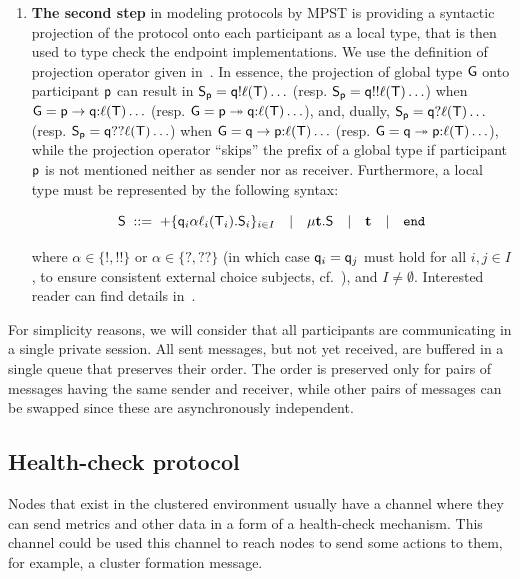 \begin{enumerate}[start=1,label={(\bfseries \arabic*)}]
	\item \textbf{The second step} in modeling protocols by MPST is providing a syntactic projection of the protocol onto each participant as a local type, that is then used to
	type check the endpoint implementations.  
	We use the definition of projection operator given in~\cite[Figure \ref{fig:fig2}]{HuY17}. 
	In essence, the projection of global type ${\sf G}$ onto participant ${\sf p}$ can result in 
	${\mathsf S}_{\sf p}={\sf q}{!}\ell({\mathsf T})\ldots$ (resp. ${\mathsf S}_{\sf p}={\sf q}{!!}\ell({\mathsf T})\ldots$) 
	when ${\sf G}={\sf p}\to{\sf q}{:}\ell({\mathsf T})\ldots$ (resp. ${\sf G}={\sf p}\twoheadrightarrow{\sf q}{:}\ell({\mathsf T})\ldots$), 
	and, dually, ${\mathsf S}_{\sf p}={\sf q}{?}\ell({\mathsf T})\ldots$ (resp. ${\mathsf S}_{\sf p}={\sf q}{??}\ell({\mathsf T})\ldots$) when ${\sf G}={\sf q}\to{\sf p}{:}\ell({\mathsf T})\ldots$ 
	(resp. ${\sf G}={\sf q}\twoheadrightarrow{\sf p}{:}\ell({\mathsf T})\ldots$), 
	while the projection operator ``skips'' the prefix of a global type if participant ${\sf p}$ is not mentioned neither as sender nor as receiver. Furthermore, a local type must be represented by the following syntax:
	
	\begin{equation}
	{\mathsf S} \; ::= \; 
	{+}\{{\sf q}_i\alpha\ell_i({\mathsf T}_i).{\mathsf S}_i\}_{i\in I}  \quad | \quad 
	\mu \textbf{t}.{\mathsf S} \quad | \quad 
	\textbf{t} \quad | \quad
	\mathtt{end}
	\end{equation}
	
	\noindent
	where $\alpha\in\{{!}, {!!}\}$ or  $\alpha\in\{{?}, {??}\}$ (in which case ${\sf q}_i={\sf q}_j$ must hold for all $i,j \in I$, to ensure consistent external choice subjects, cf.~\cite[Page 6.]{HuY17}), and $I\not=\emptyset$.
	Interested reader can find details in~\cite{HuY17}.
\end{enumerate}

\noindent
For simplicity reasons, we will consider that all participants are communicating in a single private session. All sent messages, but not yet received, are buffered in a single queue that preserves their order. The order is preserved only for pairs of messages having the same sender and receiver, while other pairs of messages can be swapped since these are asynchronously independent.
%
%
\subsection{Health-check protocol}\label{sec:health_check_protocol}
%
Nodes that exist in the clustered environment usually have a channel where they can send metrics and other data in a form of a health-check mechanism. This channel could be used this channel to reach nodes to send some actions to them, for example, a cluster formation message. 

